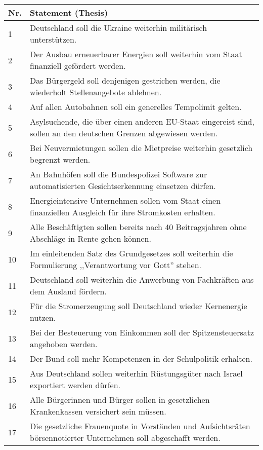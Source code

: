 \documentclass[
	fontsize=10pt,          %
	numbers=noenddot,    	%
    parskip=half,        	%
    listof=totoc,        	%
    bibliography=totoc,  	%
	headsepline=true,       %
	footsepline=false, 		%
    DIV=12                	%
]{scrartcl}
\begin{document}
\begin{longtable}{p{1cm}p{14cm}}
    \toprule
    \textbf{Nr.} & \textbf{Statement (Thesis)} \\
    \midrule
    \endhead
    1 & Deutschland soll die Ukraine weiterhin milit\"arisch unterst\"utzen. \\
    2 & Der Ausbau erneuerbarer Energien soll weiterhin vom Staat finanziell gef\"ordert werden. \\
    3 & Das B\"urgergeld soll denjenigen gestrichen werden, die wiederholt Stellenangebote ablehnen. \\
    4 & Auf allen Autobahnen soll ein generelles Tempolimit gelten. \\
    5 & Asylsuchende, die \"uber einen anderen EU-Staat eingereist sind, sollen an den deutschen Grenzen abgewiesen werden. \\
    6 & Bei Neuvermietungen sollen die Mietpreise weiterhin gesetzlich begrenzt werden. \\
    7 & An Bahnh\"ofen soll die Bundespolizei Software zur automatisierten Gesichtserkennung einsetzen d\"urfen. \\
    8 & Energieintensive Unternehmen sollen vom Staat einen finanziellen Ausgleich f\"ur ihre Stromkosten erhalten. \\
    9 & Alle Besch\"aftigten sollen bereits nach 40 Beitragsjahren ohne Abschl\"age in Rente gehen k\"onnen. \\
    10 & Im einleitenden Satz des Grundgesetzes soll weiterhin die Formulierung ,,Verantwortung vor Gott'' stehen. \\
    11 & Deutschland soll weiterhin die Anwerbung von Fachkr\"aften aus dem Ausland f\"ordern. \\
    12 & F\"ur die Stromerzeugung soll Deutschland wieder Kernenergie nutzen. \\
    13 & Bei der Besteuerung von Einkommen soll der Spitzensteuersatz angehoben werden. \\
    14 & Der Bund soll mehr Kompetenzen in der Schulpolitik erhalten. \\
    15 & Aus Deutschland sollen weiterhin R\"ustungsg\"uter nach Israel exportiert werden d\"urfen. \\
    16 & Alle B\"urgerinnen und B\"urger sollen in gesetzlichen Krankenkassen versichert sein m\"ussen. \\
    17 & Die gesetzliche Frauenquote in Vorst\"anden und Aufsichtsr\"aten b\"orsennotierter Unternehmen soll abgeschafft werden. \\

\end{longtable}
\end{document}
